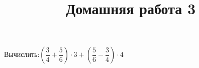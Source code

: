 %
%
\newpage
\title{Домашняя работа 3}
\begin{homework}[number=3]
	\begin{listofex}
		\item Вычислить:\quad\( \left( \dfrac{3}{4}+\dfrac{5}{6} \right)\cdot3+\left( \dfrac{5}{6}-\dfrac{3}{4} \right)\cdot4 \)
	\end{listofex}
\end{homework}
%	
%	
%	
